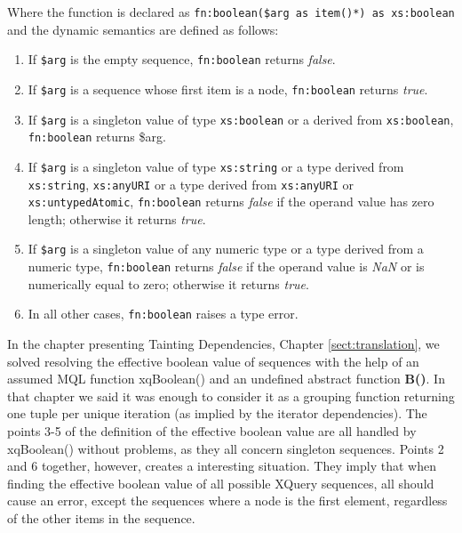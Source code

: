 Where the function is declared as \texttt{fn:boolean(\$arg as item()*) as xs:boolean} and the dynamic semantics are
defined as follows\cite{w3cfuncOps}:

\begin{enumerate}
  \item If \texttt{\$arg} is the empty sequence, \texttt{fn:boolean} returns \textit{false}.
  \item If \texttt{\$arg} is a sequence whose first item is a node, \texttt{fn:boolean} returns \textit{true}.
  \item If \texttt{\$arg} is a singleton value of type \texttt{xs:boolean} or a derived from \texttt{xs:boolean},
  \texttt{fn:boolean} returns \$arg.
  \item If \texttt{\$arg} is a singleton value of type \texttt{xs:string} or a type derived from \texttt{xs:string},
  \texttt{xs:anyURI} or a type derived from \texttt{xs:anyURI} or \texttt{xs:untypedAtomic}, \texttt{fn:boolean}
  returns \textit{false} if the operand value has zero length; otherwise it returns \textit{true}.
  \item If \texttt{\$arg} is a singleton value of any numeric type or a type derived from a numeric type,
  \texttt{fn:boolean} returns \textit{false} if the operand value is \textit{NaN} or is numerically equal to zero;
  otherwise it returns \textit{true}.
  \item In all other cases, \texttt{fn:boolean} raises a type error.
\end{enumerate}

In the chapter presenting Tainting Dependencies, Chapter \ref{sect:translation}, we solved resolving the effective
boolean value of sequences with the help of an assumed MQL function \textsf{xqBoolean()} and an undefined abstract
function \textbf{B()}. In that chapter we said it was enough to consider it as a grouping function returning one
tuple per unique iteration (as implied by the iterator dependencies). The points 3-5 of the definition of the
effective boolean value are all handled by \textsf{xqBoolean()} without problems, as they all concern singleton
sequences. Points 2 and 6 together, however, creates a interesting situation.
They imply that when finding the effective boolean value of all possible XQuery sequences, all should cause an error, except the sequences where a
node is the first element, regardless of the other items in the sequence.

